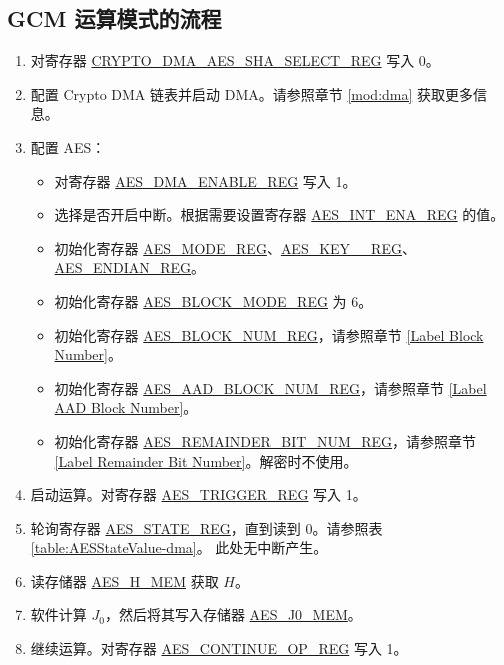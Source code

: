 \documentclass[main\_\_CN.tex]{subfiles}
\begin{document}
\subsection{ GCM 运算模式的流程 }

\begin{enumerate}
    \item 对寄存器 \hyperref[regdesc:CRYPTODMAAESSHASELECTREG]{CRYPTO\_DMA\_AES\_SHA\_SELECT\_REG} 写入 0。
    \item 配置 Crypto DMA 链表并启动 DMA。请参照章节 \ref{mod:dma} \textit{}获取更多信息。
    \item 配置 AES：
    \begin{itemize}
        \item 对寄存器 \hyperref[regdesc:AESDMAENABLEREG]{AES\_DMA\_ENABLE\_REG} 写入 1。
        \item 选择是否开启中断。根据需要设置寄存器 \hyperref[regdesc:AESINTENAREG]{AES\_INT\_ENA\_REG} 的值。
        \item 初始化寄存器 \hyperref[regdesc:AESMODEREG]{AES\_MODE\_REG}、\hyperref[regdesc:AESKEYnREG]{AES\_KEY\_\_REG}、\hyperref[regdesc:AESENDIANREG]{AES\_ENDIAN\_REG}。
        \item 初始化寄存器 \hyperref[regdesc:AESBLOCKMODEREG]{AES\_BLOCK\_MODE\_REG} 为 6。
        \item 初始化寄存器 \hyperref[regdesc:AESBLOCKNUMREG]{AES\_BLOCK\_NUM\_REG}，请参照章节 \ref{Label Block Number}。
        \item 初始化寄存器 \hyperref[regdesc:AESAADBLOCKNUMREG]{AES\_AAD\_BLOCK\_NUM\_REG}，请参照章节 \ref{Label AAD Block Number}。
        \item 初始化寄存器 \hyperref[regdesc:AESREMAINDERBITNUMREG]{AES\_REMAINDER\_BIT\_NUM\_REG}，请参照章节 \ref{Label Remainder Bit Number}。解密时不使用。
    \end{itemize}
    \item 启动运算。对寄存器 \hyperref[regdesc:AESTRIGGERREG]{AES\_TRIGGER\_REG} 写入 1。
    \item 轮询寄存器 \hyperref[regdesc:AESSTATEREG]{AES\_STATE\_REG}，直到读到 0。请参照表  \ref{table:AESStateValue-dma}。 此处无中断产生。
    \item 读存储器 \hyperref[memdesc:AESHMEM]{AES\_H\_MEM} 获取 $H$。
    \item 软件计算 $J_0$，然后将其写入存储器 \hyperref[memdesc:AESJ0MEM]{AES\_J0\_MEM}。
    \item 继续运算。对寄存器 \hyperref[regdesc:AESCONTINUEOPREG]{AES\_CONTINUE\_OP\_REG} 写入 1。

\end{enumerate}
\end{document}
